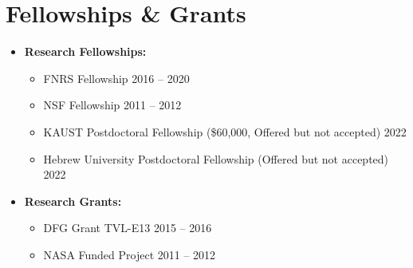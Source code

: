 \documentclass[11pt,a4paper]{article}
\begin{document}
\section*{Fellowships \& Grants}
\begin{itemize}[leftmargin=*]
    \item \textbf{Research Fellowships:}
        \begin{itemize}
            \item FNRS Fellowship \hfill 2016 -- 2020
            \item NSF Fellowship \hfill 2011 -- 2012
            \item KAUST Postdoctoral Fellowship (\$60,000, Offered but not accepted) \hfill 2022
            \item Hebrew University Postdoctoral Fellowship (Offered but not accepted) \hfill 2022
        \end{itemize}
    \item \textbf{Research Grants:}
        \begin{itemize}
            \item DFG Grant TVL-E13 \hfill 2015 -- 2016
            \item NASA Funded Project \hfill 2011 -- 2012
        \end{itemize}
\end{itemize}
\end{document}
